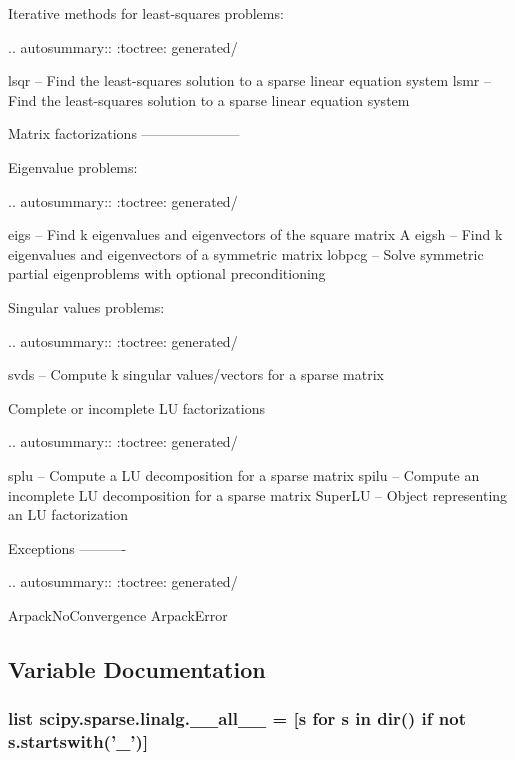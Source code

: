 \begin{DoxyVerb}
Iterative methods for least-squares problems:

.. autosummary::
   :toctree: generated/

   lsqr -- Find the least-squares solution to a sparse linear equation system
   lsmr -- Find the least-squares solution to a sparse linear equation system

Matrix factorizations
---------------------

Eigenvalue problems:

.. autosummary::
   :toctree: generated/

   eigs -- Find k eigenvalues and eigenvectors of the square matrix A
   eigsh -- Find k eigenvalues and eigenvectors of a symmetric matrix
   lobpcg -- Solve symmetric partial eigenproblems with optional preconditioning

Singular values problems:

.. autosummary::
   :toctree: generated/

   svds -- Compute k singular values/vectors for a sparse matrix

Complete or incomplete LU factorizations

.. autosummary::
   :toctree: generated/

   splu -- Compute a LU decomposition for a sparse matrix
   spilu -- Compute an incomplete LU decomposition for a sparse matrix
   SuperLU -- Object representing an LU factorization

Exceptions
----------

.. autosummary::
   :toctree: generated/

   ArpackNoConvergence
   ArpackError\end{DoxyVerb}
 

\subsection{Variable Documentation}
\hypertarget{namespacescipy_1_1sparse_1_1linalg_a847b0785b69df93bf6d9be6995ec41fe}{}
\subsubsection[{\+\_\+\+\_\+all\+\_\+\+\_\+}]{\setlength{\rightskip}{0pt plus 5cm}list scipy.\+sparse.\+linalg.\+\_\+\+\_\+all\+\_\+\+\_\+ = \mbox{[}{\bf s} for {\bf s} in dir() {\bf if} not s.\+startswith('\+\_\+')\mbox{]}}\label{namespacescipy_1_1sparse_1_1linalg_a847b0785b69df93bf6d9be6995ec41fe}
\hypertarget{namespacescipy_1_1sparse_1_1linalg_ad7af8cc0f32f0c3ad9aa9a5146ead92e}{}
